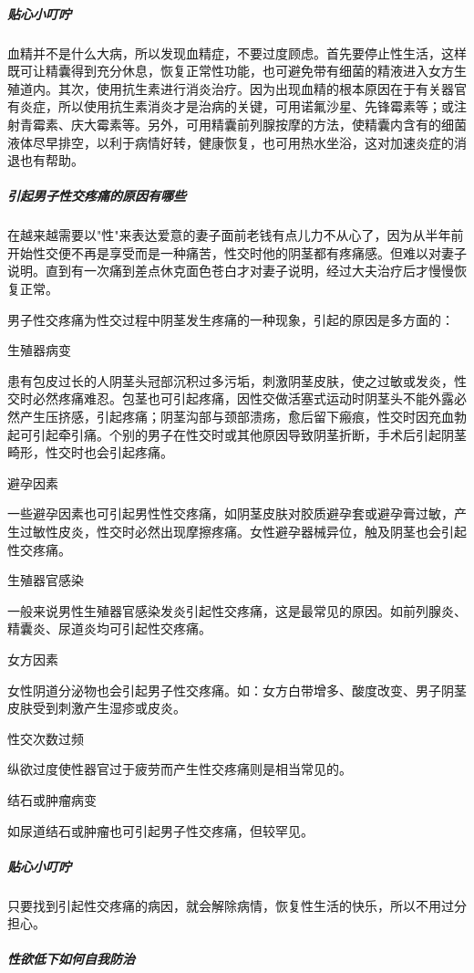 \subparagraph{贴心小叮咛}

血精并不是什么大病，所以发现血精症，不要过度顾虑。首先要停止性生活，这样既可让精囊得到充分休息，恢复正常性功能，也可避免带有细菌的精液进入女方生殖道内。其次，使用抗生素进行消炎治疗。因为出现血精的根本原因在于有关器官有炎症，所以使用抗生素消炎才是治病的关键，可用诺氟沙星、先锋霉素等；或注射青霉素、庆大霉素等。另外，可用精囊前列腺按摩的方法，使精囊内含有的细菌液体尽早排空，以利于病情好转，健康恢复，也可用热水坐浴，这对加速炎症的消退也有帮助。

\subparagraph{引起男子性交疼痛的原因有哪些}

在越来越需要以"性"来表达爱意的妻子面前老钱有点儿力不从心了，因为从半年前开始性交便不再是享受而是一种痛苦，性交时他的阴茎都有疼痛感。但难以对妻子说明。直到有一次痛到差点休克面色苍白才对妻子说明，经过大夫治疗后才慢慢恢复正常。

男子性交疼痛为性交过程中阴茎发生疼痛的一种现象，引起的原因是多方面的：

生殖器病变

患有包皮过长的人阴茎头冠部沉积过多污垢，刺激阴茎皮肤，使之过敏或发炎，性交时必然疼痛难忍。包茎也可引起疼痛，因性交做活塞式运动时阴茎头不能外露必然产生压挤感，引起疼痛；阴茎沟部与颈部溃疡，愈后留下瘢痕，性交时因充血勃起可引起牵引痛。个别的男子在性交时或其他原因导致阴茎折断，手术后引起阴茎畸形，性交时也会引起疼痛。

避孕因素

一些避孕因素也可引起男性性交疼痛，如阴茎皮肤对胶质避孕套或避孕膏过敏，产生过敏性皮炎，性交时必然出现摩擦疼痛。女性避孕器械异位，触及阴茎也会引起性交疼痛。

生殖器官感染

一般来说男性生殖器官感染发炎引起性交疼痛，这是最常见的原因。如前列腺炎、精囊炎、尿道炎均可引起性交疼痛。

女方因素

女性阴道分泌物也会引起男子性交疼痛。如：女方白带增多、酸度改变、男子阴茎皮肤受到刺激产生湿疹或皮炎。

性交次数过频

纵欲过度使性器官过于疲劳而产生性交疼痛则是相当常见的。

结石或肿瘤病变

如尿道结石或肿瘤也可引起男子性交疼痛，但较罕见。

\subparagraph{贴心小叮咛}

只要找到引起性交疼痛的病因，就会解除病情，恢复性生活的快乐，所以不用过分担心。

\subparagraph{性欲低下如何自我防治}


